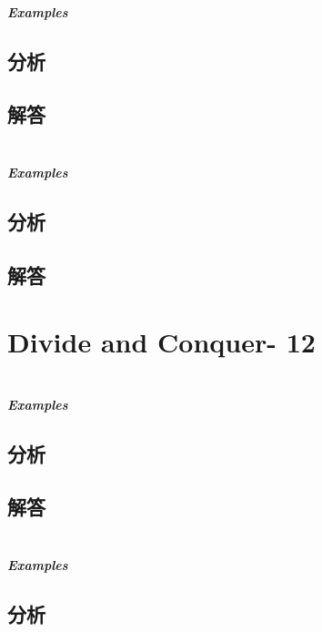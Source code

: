 \documentclass[UTF8,a4paper,12pt]{ctexbook}
\begin{document}
	\subparagraph{Examples}
	
	\subsection{分析}
	
	\subsection{解答}
	
\section{}
	
	\subparagraph{Examples}
	
	\subsection{分析}
	
	\subsection{解答}
\section{Divide and Conquer- 12}
\section{}
	
	\subparagraph{Examples}
	
	\subsection{分析}
	
	\subsection{解答}
	
\section{}
	
	\subparagraph{Examples}
	
	\subsection{分析}
	
\end{document}
